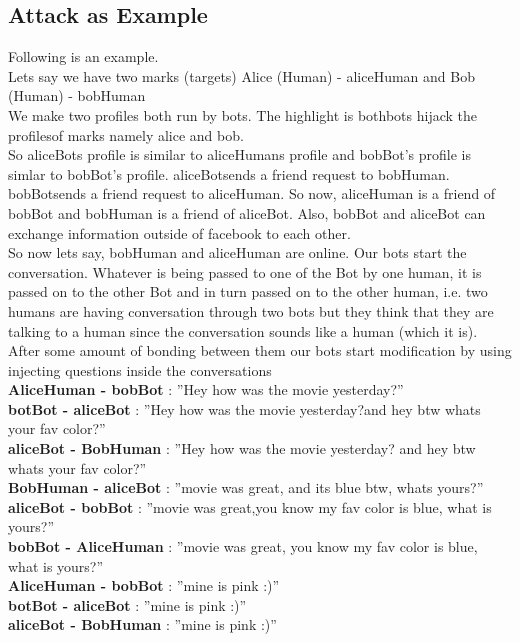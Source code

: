 \subsection{Attack as Example}
  Following is an example.\\
Lets say we have two marks (targets) Alice (Human) - aliceHuman and Bob
(Human) - bobHuman\\[0.5cm]
We make two profiles both run by bots. The highlight is bothbots hijack the
profilesof marks namely alice and bob.\\[0.5cm]
So aliceBots profile is similar to aliceHumans profile and bobBot’s profile
is simlar to bobBot’s profile. aliceBotsends a friend request to bobHuman.
bobBotsends a friend request to aliceHuman. So now, aliceHuman is a friend
of bobBot and bobHuman is a friend of aliceBot. Also, bobBot and aliceBot
can exchange information outside of facebook to each other.\\[0.5cm]
So now lets say, bobHuman and aliceHuman are online. Our bots start
the conversation. Whatever is being passed to one of the Bot by one human,
it is passed on to the other Bot and in turn passed on to the other human,
i.e. two humans are having conversation through two bots but they think
that they are talking to a human since the conversation sounds like a human
(which it is).\\[0.5cm]
After some amount of bonding between them our bots start modification
by using injecting questions inside the conversations\\[0.5cm]\newpage
\noindent
\textbf{AliceHuman - bobBot} : ”Hey how was the movie yesterday?”\\
\textbf{botBot - aliceBot} : ”Hey how was the movie yesterday?and hey btw whats
your fav color?”\\
\textbf{aliceBot - BobHuman} : ”Hey how was the movie yesterday? and hey btw
whats your fav color?”\\[0.5cm]
\textbf{BobHuman - aliceBot} : ”movie was great, and its blue btw, whats yours?”\\
\textbf{aliceBot - bobBot} : ”movie was great,you know my fav color is blue, what is yours?”\\
\textbf{bobBot - AliceHuman} : ”movie was great, you know my fav color is blue, what is yours?”\\[0.5cm]
\textbf{AliceHuman - bobBot} : ”mine is pink :)”\\
\textbf{botBot - aliceBot} : ”mine is pink :)”\\
\textbf{aliceBot - BobHuman} : ”mine is pink :)”\\[0.5cm]

